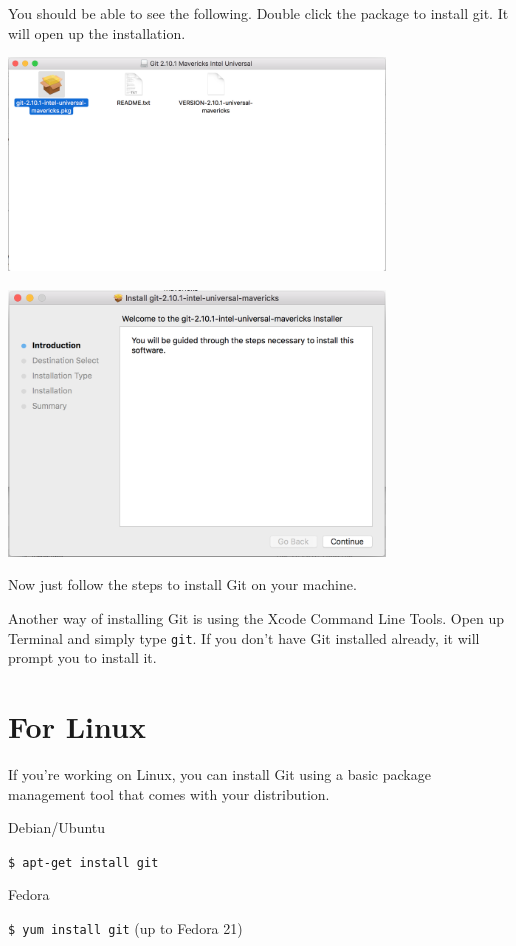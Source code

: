 \documentclass[12pt]{report}
\newcommand\code[1]{{\color{blue}\texttt{#1}}}
\begin{document}
You should be able to see the following. Double click the package to install git. It will open up the installation.

\includegraphics[width=0.75\textwidth]{git-mac-pkg}

\includegraphics[width=0.75\textwidth]{git-mac}

Now just follow the steps to install Git on your machine.

\noindent
Another way of installing Git is using the Xcode Command Line Tools. Open up Terminal 
and simply type \code{git}. If you don’t have Git installed already, it will prompt you to install it.

\section{For Linux}

If you're working on Linux, you can install Git using a basic package management tool that comes with your distribution.

Debian/Ubuntu

\code{\$ apt-get install git}

\bigskip

Fedora

\code{\$ yum install git} (up to Fedora 21)
\end{document}
